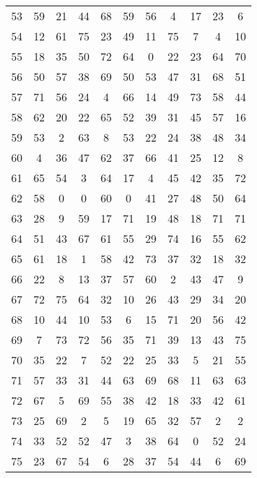 \begin{table}
\begin{tabular}{c c c c c c c c c c c }
53 & 59 & 21 & 44 & 68 & 59 & 56 & 4 & 17 & 23 & 6 \\
54 & 12 & 61 & 75 & 23 & 49 & 11 & 75 & 7 & 4 & 10 \\
55 & 18 & 35 & 50 & 72 & 64 & 0 & 22 & 23 & 64 & 70 \\
56 & 50 & 57 & 38 & 69 & 50 & 53 & 47 & 31 & 68 & 51 \\
57 & 71 & 56 & 24 & 4 & 66 & 14 & 49 & 73 & 58 & 44 \\
58 & 62 & 20 & 22 & 65 & 52 & 39 & 31 & 45 & 57 & 16 \\
59 & 53 & 2 & 63 & 8 & 53 & 22 & 24 & 38 & 48 & 34 \\
60 & 4 & 36 & 47 & 62 & 37 & 66 & 41 & 25 & 12 & 8 \\
61 & 65 & 54 & 3 & 64 & 17 & 4 & 45 & 42 & 35 & 72 \\
62 & 58 & 0 & 0 & 60 & 0 & 41 & 27 & 48 & 50 & 64 \\
63 & 28 & 9 & 59 & 17 & 71 & 19 & 48 & 18 & 71 & 71 \\
64 & 51 & 43 & 67 & 61 & 55 & 29 & 74 & 16 & 55 & 62 \\
65 & 61 & 18 & 1 & 58 & 42 & 73 & 37 & 32 & 18 & 32 \\
66 & 22 & 8 & 13 & 37 & 57 & 60 & 2 & 43 & 47 & 9 \\
67 & 72 & 75 & 64 & 32 & 10 & 26 & 43 & 29 & 34 & 20 \\
68 & 10 & 44 & 10 & 53 & 6 & 15 & 71 & 20 & 56 & 42 \\
69 & 7 & 73 & 72 & 56 & 35 & 71 & 39 & 13 & 43 & 75 \\
70 & 35 & 22 & 7 & 52 & 22 & 25 & 33 & 5 & 21 & 55 \\
71 & 57 & 33 & 31 & 44 & 63 & 69 & 68 & 11 & 63 & 63 \\
72 & 67 & 5 & 69 & 55 & 38 & 42 & 18 & 33 & 42 & 61 \\
73 & 25 & 69 & 2 & 5 & 19 & 65 & 32 & 57 & 2 & 2 \\
74 & 33 & 52 & 52 & 47 & 3 & 38 & 64 & 0 & 52 & 24 \\
75 & 23 & 67 & 54 & 6 & 28 & 37 & 54 & 44 & 6 & 69 \\
\hline
\end{tabular}
\end{table}